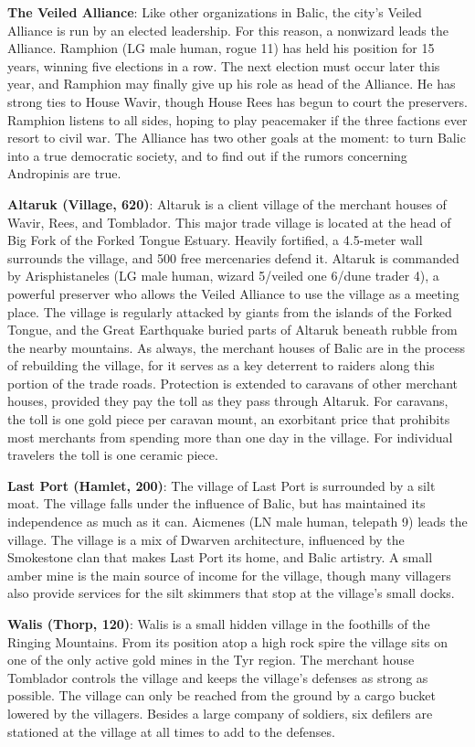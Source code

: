 {	\textbf{The Veiled Alliance}: Like other organizations in Balic, the city's Veiled Alliance is run by an elected leadership. For this reason, a nonwizard leads the Alliance. Ramphion (LG male human, rogue 11) has held his position for 15 years, winning five elections in a row. The next election must occur later this year, and Ramphion may finally give up his role as head of the Alliance. He has strong ties to House Wavir, though House Rees has begun to court the preservers. Ramphion listens to all sides, hoping to play peacemaker if the three factions ever resort to civil war. The Alliance has two other goals at the moment: to turn Balic into a true democratic society, and to find out if the rumors concerning Andropinis are true.
}
{
	\textbf{Altaruk (Village, 620)}: Altaruk is a client village of the merchant houses of Wavir, Rees, and Tomblador. This major trade village is located at the head of Big Fork of the Forked Tongue Estuary. Heavily fortified, a 4.5-meter wall surrounds the village, and 500 free mercenaries defend it. Altaruk is commanded by Arisphistaneles (LG male human, wizard 5/veiled one 6/dune trader 4), a powerful preserver who allows the Veiled Alliance to use the village as a meeting place. The village is regularly attacked by giants from the islands of the Forked Tongue, and the Great Earthquake buried parts of Altaruk beneath rubble from the nearby mountains. As always, the merchant houses of Balic are in the process of rebuilding the village, for it serves as a key deterrent to raiders along this portion of the trade roads. Protection is extended to caravans of other merchant houses, provided they pay the toll as they pass through Altaruk. For caravans, the toll is one gold piece per caravan mount, an exorbitant price that prohibits most merchants from spending more than one day in the village. For individual travelers the toll is one ceramic piece.

	\textbf{Last Port (Hamlet, 200)}: The village of Last Port is surrounded by a silt moat. The village falls under the influence of Balic, but has maintained its independence as much as it can. Aicmenes (LN male human, telepath 9) leads the village. The village is a mix of Dwarven architecture, influenced by the Smokestone clan that makes Last Port its home, and Balic artistry. A small amber mine is the main source of income for the village, though many villagers also provide services for the silt skimmers that stop at the village's small docks.

	\textbf{Walis (Thorp, 120)}: Walis is a small hidden village in the foothills of the Ringing Mountains. From its position atop a high rock spire the village sits on one of the only active gold mines in the Tyr region. The merchant house Tomblador controls the village and keeps the village's defenses as strong as possible. The village can only be reached from the ground by a cargo bucket lowered by the villagers. Besides a large company of soldiers, six defilers are stationed at the village at all times to add to the defenses.
}
